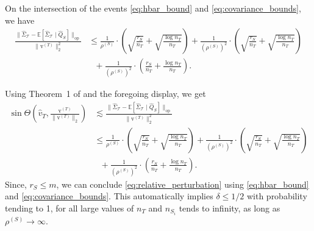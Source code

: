 \documentclass[10pt]{article}
\newcommand{\Ebb}{\mathbb E}
\newcommand{\op}{\mathrm{op}}
\newcommand{\wh}{\widehat}
\newcommand{\calT}{\mathcal T}
\newcommand{\trg}{T}
\newcommand{\nT}{n_{\trg}}
\newcommand{\rmqv}{\mathrm{v}^{(\trg)}}
\newcommand{\src}{S}
\newcommand{\nSm}[1]{n_{\src_{#1}}}
\begin{document}
On the intersection of the events \eqref{eq:hbar_bound} and \eqref{eq:covariance_bounds}, we have
\begin{align}
    \frac{\|\wh\Sigma_\calT-\Ebb[\wh\Sigma_{\calT}\mid\wh Q_\src]\|_{\op}}{\|\rmqv\|_2^2}&\le\frac{1}{\rho^{(\src)}}\cdot\left(\sqrt{\frac{r_\src}{\nT}}+\sqrt{\frac{\log\nT}{\nT}}\right)+\frac{1}{(\rho^{(\src)})^2}\cdot\left(\sqrt{\frac{r_\src}{\nT}}+\sqrt{\frac{\log\nT}{\nT}}\right)\\
    &~~~+\frac{1}{(\rho^{(\src)})^2}\cdot\left(\frac{r_\src}{\nT}+\frac{\log\nT}{\nT}\right).
\end{align}

Using Theorem~1 of \cite{yu2015useful} and the foregoing display, we get
\begin{align}
\label{eq:davis_kahan}
\sin\Theta\left(\wh v_\trg,\frac{\rmqv}{\|\rmqv\|_2}\right)&\lesssim \frac{\|\wh\Sigma_\calT-\Ebb[\wh\Sigma_{\calT}\mid\wh Q_\src]\|_{\op}}{\|\rmqv\|_2^2}\\
&\le\frac{1}{\rho^{(\src)}}\cdot\left(\sqrt{\frac{r_\src}{\nT}}+\sqrt{\frac{\log\nT}{\nT}}\right)+\frac{1}{(\rho^{(\src)})^2}\cdot\left(\sqrt{\frac{r_\src}{\nT}}+\sqrt{\frac{\log\nT}{\nT}}\right)\\
    &~~~+\frac{1}{(\rho^{(\src)})^2}\cdot\left(\frac{r_\src}{\nT}+\frac{\log\nT}{\nT}\right).
\end{align}
Since, $r_\src \le m$, we can conclude \eqref{eq:relative_perturbation} using \eqref{eq:hbar_bound} and \eqref{eq:covariance_bounds}. This automatically implies $\delta \le 1/2$ with probability tending to 1, for all large values of $\nT$ and $\nSm{i}$ tends to infinity, as long as $\rho^{(\src)} \to \infty$.
\end{document}
